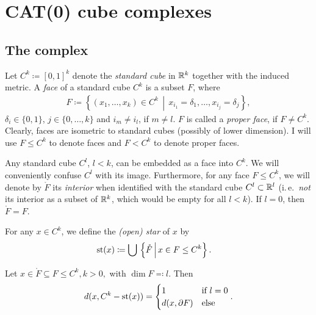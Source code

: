 \section{CAT(0) cube complexes}
\label{sec:complexes}

\subsection{The complex}
\label{sec:complex}


\begin{defin}
  Let \(C^k \coloneqq {[0,1]}^k\) denote the \emph{standard cube} in \(\mathbb{R}^k\) together with the induced metric. A \emph{face} of a standard cube \(C^k\) is a subset \(F\), where
  \begin{align*}
    F \coloneqq \left\{(x_1, \dots, x_k) \in C^k \,\middle |\, x_{i_1} = \delta_1, \dots, x_{i_j}  = \delta_j\right\},
  \end{align*}
  \(\delta_i \in \{0, 1\}\), \(j \in \{0, \dots, k\}\) and \(i_m \neq i_l\), if \(m \neq l\). \(F\) is called a \emph{proper face}, if \(F \neq C^k\). Clearly, faces are isometric to standard cubes (possibly of lower dimension). I will use \(F \leq C^k\) to denote faces and \(F < C^k\) to denote proper faces.

  Any standard cube \(C^l\), \(l < k\), can be embedded as a face into \(C^k\). We will conveniently confuse \(C^l\) with its image. Furthermore, for any face \(F \leq C^k\), we will denote by \(\mathring{F}\) its \emph{interior} when identified with the standard cube \(C^l \subset \mathbb{R}^l\) (i.\,e.\ \emph{not} its interior as a subset of \(\mathbb{R}^k\), which would be empty for all \(l < k\)). If \(l = 0\), then \(\mathring{F} = F\).

  For any \(x \in C^k\), we define the \emph{(open) star} of \(x\) by
  \begin{align*}
    \operatorname{st}(x) & \coloneqq \bigcup\,\left\{\mathring{F} \,\middle|\, x \in F \leq C^k\right\}.
  \end{align*}
\end{defin}

\begin{lemma}
  \label{lemma:cube-dist}
  Let \(x \in \mathring{F} \subseteq F \leq C^k, k > 0,\) with \(\dim F \eqqcolon l\). Then
  \begin{align*}
    d(x, C^k - \operatorname{st}(x)) =
    \begin{cases}
      1 & \text{if } l = 0\\
      d(x, \partial F) & \text{else}
    \end{cases}
                         .
  \end{align*}
\end{lemma}

